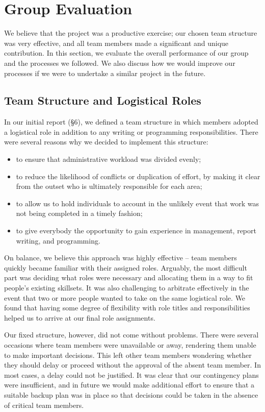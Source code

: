 \newpage
\section{Group Evaluation}
\label{sec:group_evaluation}

We believe that the project was a productive exercise; our chosen team structure was very effective, and all team members made a significant and unique contribution. In this section, we evaluate the overall performance of our group and the processes we followed. We also discuss how we would improve our processes if we were to undertake a similar project in the future.

\subsection{Team Structure and Logistical Roles}
In our initial report (§6), we defined a team structure in which members adopted a logistical role in addition to any writing or programming responsibilities. There were several reasons why we decided to implement this structure:
\begin{itemize}[noitemsep,topsep=1pt]
	\item to ensure that administrative workload was divided evenly;
	\item to reduce the likelihood of conflicts or duplication of effort, by making it clear from the outset who is ultimately responsible for each area;
	\item to allow us to hold individuals to account in the unlikely event that work was not being completed in a timely fashion;
	\item to give everybody the opportunity to gain experience in management, report writing, and programming.
\end{itemize}

On balance, we believe this approach was highly effective -- team members quickly became familiar with their assigned roles. Arguably, the most difficult part was deciding what roles were necessary and allocating them in a way to fit people’s existing skillsets. It was also challenging to arbitrate effectively in the event that two or more people wanted to take on the same logistical role. We found that having some degree of flexibility with role titles and responsibilities helped us to arrive at our final role assignments.

Our fixed structure, however, did not come without problems. There were several occasions where team members were unavailable or away, rendering them unable to make important decisions. This left other team members wondering whether they should delay or proceed without the approval of the absent team member. In most cases, a delay could not be justified. It was clear that our contingency plans were insufficient, and in future we would make additional effort to ensure that a suitable backup plan was in place so that decisions could be taken in the absence of critical team members.

